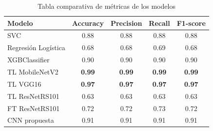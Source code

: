 \begin{table}[H]
    \centering
    \begin{tabular}{lcccc}
        \toprule
        Modelo              & Accuracy & Precision & Recall & F1-score \\
        \midrule
        SVC                 & 0.88 & 0.88 & 0.88 & 0.88 \\
        Regresión Logística & 0.68 & 0.68 & 0.69 & 0.68 \\
        XGBClassifier       & 0.90 & 0.90 & 0.90 & 0.90 \\
        TL MobileNetV2      & \textbf{0.99} & \textbf{0.99} & \textbf{0.99} & \textbf{0.99} \\
        TL VGG16            & \textbf{0.97} & \textbf{0.97} & \textbf{0.97} & \textbf{0.97} \\
        TL ResNetRS101      & 0.63 & 0.63 & 0.63 & 0.63 \\
        FT ResNetRS101      & 0.72 & 0.72 & 0.73 & 0.72 \\
        CNN propuesta       & 0.91 & 0.91 & 0.91 & 0.91 \\
        \bottomrule
    \end{tabular}
    \caption{Tabla comparativa de métricas de los modelos}
    \label{tabla:resultados_modelos}
\end{table}